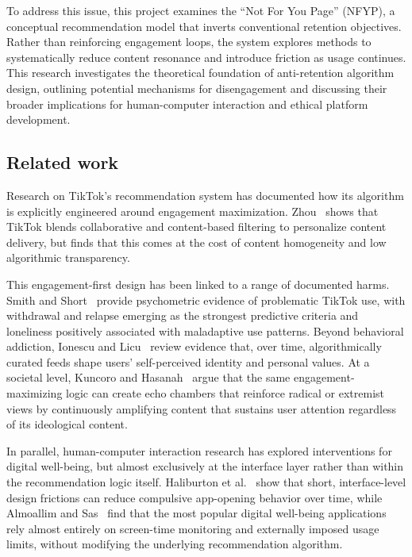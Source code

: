 \documentclass[10pt,leqno,twoside]{article}
\begin{document}
To address this issue, this project examines the ``Not For You Page'' (NFYP), a conceptual recommendation model that inverts conventional retention objectives. Rather than reinforcing engagement loops, the system explores methods to systematically reduce content resonance and introduce friction as usage continues. This research investigates the theoretical foundation of anti-retention algorithm design, outlining potential mechanisms for disengagement and discussing their broader implications for human-computer interaction and ethical platform development.


\subsection{Related work}

Research on TikTok's recommendation system has documented how its algorithm is explicitly engineered around engagement maximization. Zhou~\cite{zhou2024understanding} shows that TikTok blends collaborative and content-based filtering to personalize content delivery, but finds that this comes at the cost of content homogeneity and low algorithmic transparency.

This engagement-first design has been linked to a range of documented harms. Smith and Short~\cite{smith2022needs} provide psychometric evidence of problematic TikTok use, with withdrawal and relapse emerging as the strongest predictive criteria and loneliness positively associated with maladaptive use patterns. Beyond behavioral addiction, Ionescu and Licu~\cite{ionescu2023tiktok} review evidence that, over time, algorithmically curated feeds shape users' self-perceived identity and personal values. At a societal level, Kuncoro and Hasanah~\cite{kuncoro2024social} argue that the same engagement-maximizing logic can create echo chambers that reinforce radical or extremist views by continuously amplifying content that sustains user attention regardless of its ideological content.

In parallel, human-computer interaction research has explored interventions for digital well-being, but almost exclusively at the interface layer rather than within the recommendation logic itself. Haliburton et al.~\cite{haliburton2024friction} show that short, interface-level design frictions can reduce compulsive app-opening behavior over time, while Almoallim and Sas~\cite{almoallim2022wellbeing} find that the most popular digital well-being applications rely almost entirely on screen-time monitoring and externally imposed usage limits, without modifying the underlying recommendation algorithm.
\end{document}
